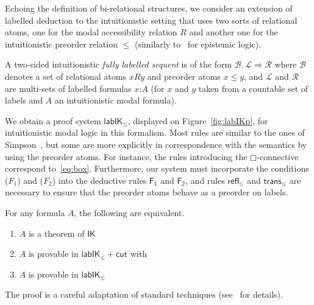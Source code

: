 \documentclass[twoside]{aiml20}
\newcommand*{\rel}{R}
\newcommand*{\BOX}{\mathord{\Box}}
\newcommand*{\IK}{\mathsf{IK}}
\newcommand*{\lab}{\mathsf{lab}}
\newcommand*{\labIKp}{\lab\IK_{\le}}
\newcommand*{\rn}[1]  {\ensuremath{\mathsf{#1}}}
\newcommand*{\lb}[1]{#1}%
\newcommand*{\fm}[1]{#1}%
\newcommand{\SEQ}{\Rightarrow}
\newcommand{\B}{\mathcal{B}}
\newcommand{\Left}{\mathcal{L}}
\newcommand{\Right}{\mathcal{R}}
\newcommand*{\labels}[2]{\lb{#1}\mathord{:}\fm{#2}}
\newcommand*{\accs}[2]{\lb{#1}R\lb{#2}}
\newcommand*{\futs}[2]{\lb{#1}\le{\lb{#2}}}
\newcommand*{\labrn}[2][]  {\rn{#2}_{#1}}%
\begin{document}
Echoing the definition of bi-relational structures, we consider an extension of labelled deduction to the intuitionistic setting
%
that uses two sorts of relational atoms, one for the modal accessibility relation $\rel$ and another one for the intuitionistic preorder relation $\leq$ (similarly to~\cite{maffezioli2013} for epistemic logic). 
%
\begin{definition}
	A two-sided intuitionistic \emph{fully labelled sequent} is of the form $\B, \Left \SEQ \Right$ where $\B$ denotes a set of relational atoms $\accs xy$ and preorder atoms $\futs xy$, and $\Left$ and $\Right$ are multi-sets of labelled formulas $\labels{x}{A}$ (for $\lb x$ and $\lb y$ taken from a countable set of labels and $A$ an intuitionistic modal formula).
\end{definition}
%
We obtain a proof system $\labIKp$, displayed on Figure~\ref{fig:labIKp}, for intuitionistic modal logic in this formalism. 
%
Most rules are similar to the ones of Simpson~\cite{simpson1994}, but some are more explicitly in correspondence with the semantics by using the preorder atoms. 
%
For instance, the rules introducing the $\BOX$-connective correspond to~\eqref{eq:box}.
%
Furthermore, our system must incorporate the conditions ($F_1$) and ($F_2$) into the deductive rules $\rn{F_1}$ and $\rn{F_2}$, and rules $\rn{refl_\le}$ and $\rn{trans_\le}$ are necessary to ensure that the preorder atoms behave as a preorder on labels.
%
\begin{theorem}\label{thm:cutfree-compl}
	For any formula $A$, the following are equivalent.
	\begin{enumerate}
		\item\label{i} $A$ is a theorem of $\IK$ 
		\item\label{ii} $A$ is provable in $\labIKp +\labrn{cut}$ with \quad
		\item\label{iii} $A$ is provable in $\labIKp$
	\end{enumerate}
\end{theorem}

The proof is a careful adaptation of standard techniques (see~\cite{marin:morales:strassburger:hal} for details).
\end{document}
